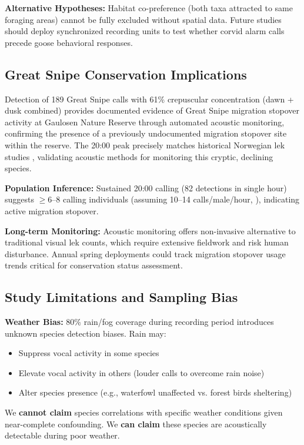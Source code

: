 \documentclass[twocolumn]{article}
\begin{document}
\textbf{Alternative Hypotheses:} Habitat co-preference (both taxa attracted to same foraging areas) cannot be fully excluded without spatial data. Future studies should deploy synchronized recording units to test whether corvid alarm calls precede goose behavioral responses.

\subsection{Great Snipe Conservation Implications}

Detection of 189 Great Snipe calls with 61\% crepuscular concentration (dawn + dusk combined) provides documented evidence of Great Snipe migration stopover activity at Gaulosen Nature Reserve through automated acoustic monitoring, confirming the presence of a previously undocumented migration stopover site within the reserve. The 20:00 peak precisely matches historical Norwegian lek studies \citep{Kålås1995}, validating acoustic methods for monitoring this cryptic, declining species.

\textbf{Population Inference:} Sustained 20:00 calling (82 detections in single hour) suggests $\geq$6--8 calling individuals (assuming 10--14 calls/male/hour, \citet{Höglund2020}), indicating active migration stopover.

\textbf{Long-term Monitoring:} Acoustic monitoring offers non-invasive alternative to traditional visual lek counts, which require extensive fieldwork and risk human disturbance. Annual spring deployments could track migration stopover usage trends critical for conservation status assessment.

\subsection{Study Limitations and Sampling Bias}

\textbf{Weather Bias:} 80\% rain/fog coverage during recording period introduces unknown species detection biases. Rain may:
\begin{itemize}
\item Suppress vocal activity in some species
\item Elevate vocal activity in others (louder calls to overcome rain noise)
\item Alter species presence (e.g., waterfowl unaffected vs. forest birds sheltering)
\end{itemize}

We \textbf{cannot claim} species correlations with specific weather conditions given near-complete confounding. We \textbf{can claim} these species are acoustically detectable during poor weather.
\end{document}
